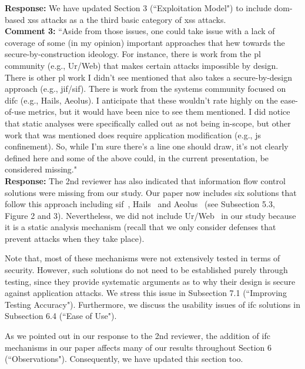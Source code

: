 \documentclass[10pt,journal,compsoc]{IEEEtran}
\begin{document}
\noindent
{\bf Response:}
We have updated Section 3 (``Exploitation Model")
to include {\sc dom}-based {\sc xss} attacks
as a the third basic category of {\sc xss}
attacks.\\

\noindent
{\bf Comment 3:} ``Aside from those issues,
one could take issue with a lack of coverage of some
(in my opinion) important approaches that hew towards the
secure-by-construction ideology.
For instance,
there is work from the {\sc pl} community (e.g., Ur/Web)
that makes certain attacks impossible by design.
There is other {\sc pl} work I didn't
see mentioned that also takes a
secure-by-design approach (e.g., {\sc jif}/{\sc sif}).
There is work from the systems
community focused on {\sc difc} (e.g., Hails, Aeolus).
I anticipate that these
wouldn't rate highly on the ease-of-use metrics,
but it would have been nice to see them mentioned.
I did notice that static analyses were specifically
called out as not being in-scope,
but other work that was mentioned does
require application modification (e.g., {\sc js} confinement).
So, while I'm sure there's a line one should draw,
it's not clearly defined here and some of the
above could, in the current presentation,
be considered missing."\\

\noindent
{\bf Response:}
The 2nd reviewer has also indicated that
information flow control solutions
were missing from our study.
Our paper now includes six solutions
that follow this approach
including {\sc sif}~\cite{CVMA07},
Hails~\cite{GLSTMMR12}
and Aeolus~\cite{CPSPBCCSL12}
(see Subsection 5.3, Figure 2 and 3).
Nevertheless,
we did not include Ur/Web~\cite{C10b}
in our study because it is a static 
analysis mechanism
(recall that we only consider defenses
that prevent attacks when they take place).

Note that,
most of these mechanisms were not
extensively tested in terms of security.
However,
such solutions do not need to be
established purely through testing,
since they provide systematic
arguments as to why their design is
secure against application attacks.
We stress this issue in Subsection
7.1 (``Improving Testing Accuracy").
Furthermore,
we discuss the usability issues of
{\sc ifc} solutions in Subsection 6.4
(``Ease of Use").

As we pointed out in our
response to the 2nd reviewer,
the addition of {\sc ifc} mechanisms
in our paper affects many of our results
throughout Section 6 (``Observations").
Consequently,
we have updated this section too.\\



\end{document}
